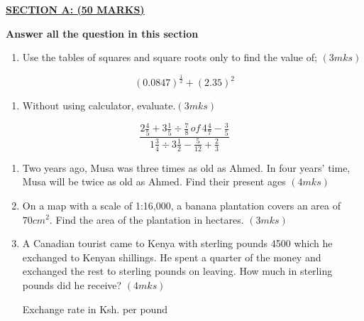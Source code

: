 \documentclass[
  a4paperpaper,
]{scrbook}
\providecommand{\tightlist}{%
  \setlength{\itemsep}{0pt}\setlength{\parskip}{0pt}}\usepackage{longtable,booktabs,array}
\begin{document}
\begin{tcolorbox}[enhanced jigsaw, left=2mm, colframe=quarto-callout-note-color-frame, toptitle=1mm, opacitybacktitle=0.6, rightrule=.15mm, colbacktitle=quarto-callout-note-color!10!white, colback=white, arc=.35mm, breakable, leftrule=.75mm, bottomtitle=1mm, bottomrule=.15mm, title=\textcolor{quarto-callout-note-color}{\faInfo}\hspace{0.5em}{Model Sample Paper 2}, titlerule=0mm, coltitle=black, toprule=.15mm, opacityback=0]

\ul{\textbf{SECTION A: (50 MARKS)}}

\textbf{Answer all the question in this section}

\begin{enumerate}
\def\labelenumi{\arabic{enumi}.}
\tightlist
\item
  Use the tables of squares and square roots only to find the value of;
  \((3mks)\)
\end{enumerate}

\[ \left(0.0847\right)^\frac{1}{2}+\left(2.35\right)^2\]

\begin{enumerate}
\def\labelenumi{\arabic{enumi}.}
\setcounter{enumi}{1}
\tightlist
\item
  Without using calculator, evaluate.\((3mks)\)
\end{enumerate}

\[\frac{2\frac{4}{5}+3\frac{1}{5}\div\frac{7}{8}\,of\,4\frac{4}{7}-\frac{3}{5}}{1\frac{3}{4}\div3\frac{1}{2}-\frac{5}{12}+\frac{2}{3}} \]

\begin{enumerate}
\def\labelenumi{\arabic{enumi}.}
\setcounter{enumi}{2}
\item
  Two years ago, Musa was three times as old as Ahmed. In four years'
  time, Musa will be twice as old as Ahmed. Find their present ages
  \((4mks)\)
\item
  On a map with a scale of 1:16,000, a banana plantation covers an area
  of \(70cm^2\). Find the area of the plantation in hectares. \((3mks)\)
\item
  A Canadian tourist came to Kenya with sterling pounds 4500 which he
  exchanged to Kenyan shillings. He spent a quarter of the money and
  exchanged the rest to sterling pounds on leaving. How much in sterling
  pounds did he receive? \((4mks)\)

  Exchange rate in Ksh. per pound
\end{enumerate}


\end{tcolorbox}
\end{document}
